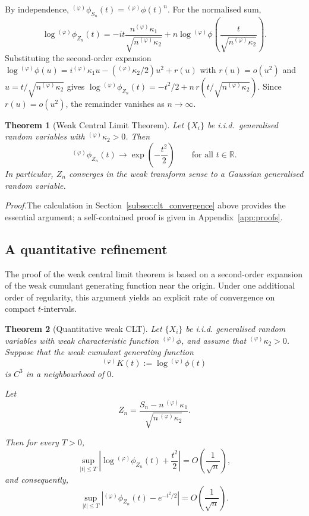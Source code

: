 \documentclass[12pt]{article}
\newtheorem{theorem}{Theorem}[section]
\theoremstyle{definition}
\newcommand{\R}{\mathbb{R}}
\begin{document}
By independence, ${}^{(\varphi)}\phi_{S_n}(t) = {}^{(\varphi)}\phi(t)^n$.  For the normalised sum,
\[
\log {}^{(\varphi)}\phi_{Z_n}(t)
=
-it\frac{n{}^{(\varphi)}\kappa_1}{\sqrt{n{}^{(\varphi)}\kappa_2}}
+
n \log {}^{(\varphi)}\phi\!\left(\frac{t}{\sqrt{n{}^{(\varphi)}\kappa_2}}\right).
\]
Substituting the second-order expansion $\log {}^{(\varphi)}\phi(u) = i{}^{(\varphi)}\kappa_1 u - ({}^{(\varphi)}\kappa_2/2)u^2 + r(u)$ with $r(u)=o(u^2)$ and $u = t/\sqrt{n{}^{(\varphi)}\kappa_2}$ gives $\log {}^{(\varphi)}\phi_{Z_n}(t) = -t^2/2 + n\,r(t/\sqrt{n{}^{(\varphi)}\kappa_2})$.  Since $r(u) = o(u^2)$, the remainder vanishes as $n\to\infty$.

\begin{theorem}[Weak Central Limit Theorem]\label{thm:weak-clt}
Let $\{X_i\}$ be i.i.d.\ generalised random variables with ${}^{(\varphi)}\kappa_2 > 0$.  Then
\[
{}^{(\varphi)}\phi_{Z_n}(t) \to \exp\!\left(-\frac{t^2}{2}\right)
\qquad \text{for all } t \in \R.
\]
In particular, $Z_n$ converges in the weak transform sense to a Gaussian generalised random variable.
\end{theorem}

\noindent\textit{Proof.}\enspace The calculation in Section~\ref{subsec:clt_convergence} above provides the essential argument; a self-contained proof is given in Appendix~\ref{app:proofs}.\medskip

\subsection{A quantitative refinement}
\label{subsec:clt_quatitative}

The proof of the weak central limit theorem is based on a second-order
expansion of the weak cumulant generating function near the origin.
Under one additional order of regularity, this argument yields an explicit
rate of convergence on compact \(t\)-intervals.

\begin{theorem}[Quantitative weak CLT]
\label{thm:weak-BE}
Let \(\{X_i\}\) be i.i.d. generalised random variables with weak
characteristic function \({}^{(\varphi)}\phi\), and assume that
\({}^{(\varphi)}\kappa_2 > 0\). Suppose that the weak cumulant generating
function
\[
{}^{(\varphi)}K(t) := \log {}^{(\varphi)}\phi(t)
\]
is \(C^3\) in a neighbourhood of \(0\).

Let
\[
Z_n
=
\frac{S_n - n\,{}^{(\varphi)}\kappa_1}
{\sqrt{n\,{}^{(\varphi)}\kappa_2}}.
\]

Then for every \(T>0\),
\[
\sup_{|t|\le T}
\left|
\log {}^{(\varphi)}\phi_{Z_n}(t)
+
\frac{t^2}{2}
\right|
=
O\!\left(\frac{1}{\sqrt{n}}\right),
\]
and consequently,
\[
\sup_{|t|\le T}
\left|
{}^{(\varphi)}\phi_{Z_n}(t)
-
e^{-t^2/2}
\right|
=
O\!\left(\frac{1}{\sqrt{n}}\right).
\]
\end{theorem}
\end{document}
